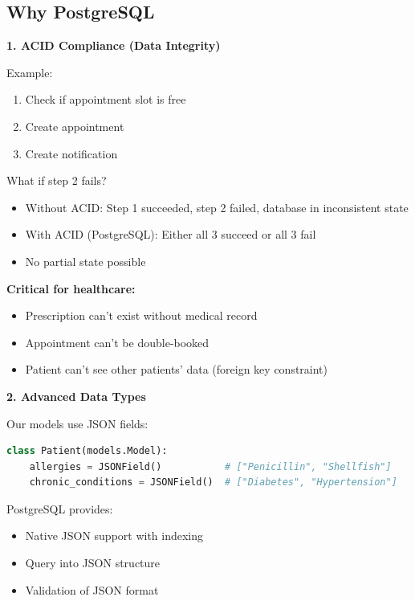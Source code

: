 \documentclass[11pt,a4paper,twoside]{report}
\begin{document}
\subsection{Why PostgreSQL}

\textbf{1. ACID Compliance (Data Integrity)}

Example:
\begin{enumerate}
    \item Check if appointment slot is free
    \item Create appointment
    \item Create notification
\end{enumerate}

What if step 2 fails?

\begin{itemize}
    \item Without ACID: Step 1 succeeded, step 2 failed, database in inconsistent state
    \item With ACID (PostgreSQL): Either all 3 succeed or all 3 fail
    \item No partial state possible
\end{itemize}

\textbf{Critical for healthcare:}
\begin{itemize}
    \item Prescription can't exist without medical record
    \item Appointment can't be double-booked
    \item Patient can't see other patients' data (foreign key constraint)
\end{itemize}

\textbf{2. Advanced Data Types}

Our models use JSON fields:

\begin{lstlisting}[language=Python]
class Patient(models.Model):
    allergies = JSONField()           # ["Penicillin", "Shellfish"]
    chronic_conditions = JSONField()  # ["Diabetes", "Hypertension"]
\end{lstlisting}

PostgreSQL provides:
\begin{itemize}
    \item Native JSON support with indexing
    \item Query into JSON structure
    \item Validation of JSON format
\end{itemize}
\end{document}
